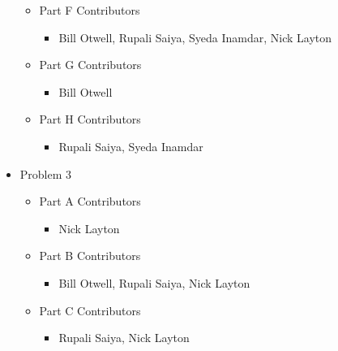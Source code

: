 \documentclass[11pt]{article}
\begin{document}
\begin{itemize}
\begin{itemize}
		\item Part F Contributors
			\begin{itemize}
				\item Bill Otwell, Rupali Saiya, Syeda Inamdar, Nick Layton
			\end{itemize}
			
		\item Part G Contributors
			\begin{itemize}
				\item Bill Otwell
			\end{itemize}
			
		\item Part H Contributors
			\begin{itemize}
				\item Rupali Saiya, Syeda Inamdar
			\end{itemize}
	\end{itemize}
	
	\item Problem 3
	\begin{itemize}
		\item Part A Contributors
			\begin{itemize}
				\item Nick Layton
			\end{itemize}
			
		\item Part B Contributors
			\begin{itemize}
				\item Bill Otwell, Rupali Saiya, Nick Layton
			\end{itemize}
			
		\item Part C Contributors
			\begin{itemize}
				\item Rupali Saiya, Nick Layton
			\end{itemize}
	\end{itemize}
\end{itemize}
\end{document}
